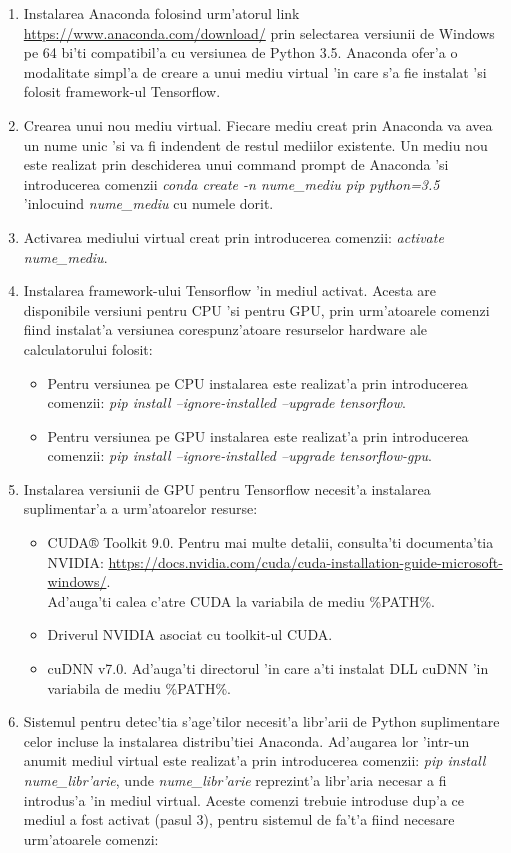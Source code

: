 \documentclass[12pt,a4paper,twoside]{report}
\begin{document}
\begin{enumerate}
\item Instalarea Anaconda folosind urm'atorul link \url{https://www.anaconda.com/download/} prin selectarea versiunii de Windows pe 64 bi'ti compatibil'a cu versiunea de Python 3.5.
Anaconda ofer'a o modalitate simpl'a de creare a unui mediu virtual 'in care s'a fie instalat 'si folosit framework-ul Tensorflow.
\item Crearea unui nou mediu virtual. Fiecare mediu creat prin Anaconda va avea un nume unic 'si va fi indendent de restul mediilor existente. Un mediu nou este realizat prin deschiderea unui command prompt de Anaconda 'si introducerea comenzii \textit{conda create -n nume\_mediu pip python=3.5} 'inlocuind \textit{nume\_mediu} cu numele dorit.
\item Activarea mediului virtual creat prin introducerea comenzii: \textit{activate nume\_mediu}.
\item Instalarea framework-ului Tensorflow 'in mediul activat. Acesta are disponibile versiuni pentru CPU 'si pentru GPU, prin urm'atoarele comenzi fiind instalat'a versiunea corespunz'atoare resurselor hardware ale calculatorului folosit:
\begin{itemize}
\item Pentru versiunea pe CPU instalarea este realizat'a prin introducerea comenzii: \textit{pip install --ignore-installed --upgrade tensorflow}.
\item Pentru versiunea pe GPU instalarea este realizat'a prin introducerea comenzii: \textit{pip install --ignore-installed --upgrade tensorflow-gpu}.
\end{itemize}
\item Instalarea versiunii de GPU pentru Tensorflow necesit'a instalarea suplimentar'a a urm'atoarelor resurse:
\begin{itemize}
\item CUDA® Toolkit 9.0. Pentru mai multe detalii, consulta'ti documenta'tia NVIDIA: \url{https://docs.nvidia.com/cuda/cuda-installation-guide-microsoft-windows/}.\\Ad'auga'ti calea c'atre CUDA la variabila de mediu \%PATH\%.
\item Driverul NVIDIA asociat cu toolkit-ul CUDA.
\item cuDNN v7.0. Ad'auga'ti directorul 'in care a'ti instalat DLL cuDNN 'in variabila de mediu \%PATH\%.
\end{itemize}
\item Sistemul pentru detec'tia s'age'tilor necesit'a libr'arii de Python suplimentare celor incluse la instalarea distribu'tiei Anaconda. Ad'augarea lor 'intr-un anumit mediul virtual este realizat'a prin introducerea comenzii: \textit{pip install nume\_libr'arie}, unde \textit{nume\_libr'arie} reprezint'a libr'aria necesar a fi introdus'a 'in mediul virtual. Aceste comenzi trebuie introduse dup'a ce mediul a fost activat (pasul 3), pentru sistemul de fa't'a fiind necesare urm'atoarele comenzi:

\end{enumerate}
\end{document}
